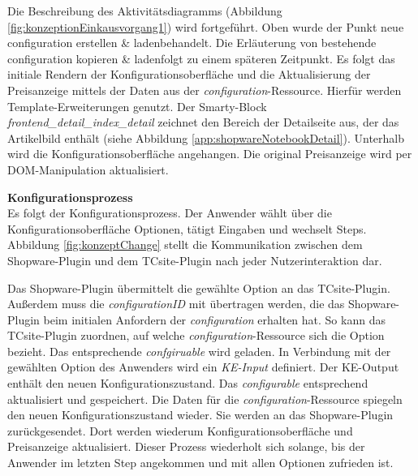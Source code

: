 \documentclass[12pt,a4paper,bibliography=totocnumbered,listof=totoc]{scrartcl}
\begin{document}
Die Beschreibung des Aktivitätsdiagramms (Abbildung \ref{fig:konzeptionEinkausvorgang1}) wird fortgeführt. Oben wurde der Punkt \glqq neue configuration erstellen \& laden\grqq behandelt. Die Erläuterung von \glqq bestehende configuration kopieren \& laden\grqq folgt zu einem späteren Zeitpunkt. Es folgt das initiale Rendern der Konfigurationsoberfläche und die Aktualisierung der Preisanzeige mittels der Daten aus der \emph{configuration}-Ressource. Hierfür werden Template-Erweiterungen genutzt. Der Smarty-Block \emph{frontend\_detail\_index\_detail} zeichnet den Bereich der Detailseite aus, der das Artikelbild enthält (siehe Abbildung \ref{app:shopwareNotebookDetail}). Unterhalb wird die Konfigurationsoberfläche angehangen. Die original Preisanzeige wird per DOM-Manipulation aktualisiert.

\textbf{Konfigurationsprozess}\\
Es folgt der Konfigurationsprozess. Der Anwender wählt über die Konfigurationsoberfläche Optionen, tätigt Eingaben und wechselt Steps. Abbildung \ref{fig:konzeptChange} stellt die Kommunikation zwischen dem Shopware-Plugin und dem TCsite-Plugin nach jeder Nutzerinteraktion dar.

Das Shopware-Plugin übermittelt die gewählte Option an das TCsite-Plugin. Außerdem muss die \emph{configurationID} mit übertragen werden, die das Shopware-Plugin beim initialen Anfordern der \emph{configuration} erhalten hat. So kann das TCsite-Plugin zuordnen, auf welche \emph{configuration}-Ressource sich die Option bezieht. Das entsprechende \emph{confgiruable} wird geladen. In Verbindung mit der gewählten Option des Anwenders wird ein \emph{KE-Input} definiert. Der KE-Output enthält den neuen Konfigurationszustand. Das \emph{configurable} entsprechend aktualisiert und gespeichert. Die Daten für die \emph{configuration}-Ressource spiegeln den neuen Konfigurationszustand wieder. Sie werden an das Shopware-Plugin zurückgesendet. Dort werden wiederum Konfigurationsoberfläche und Preisanzeige aktualisiert. Dieser Prozess wiederholt sich solange, bis der Anwender im letzten Step angekommen und mit allen Optionen zufrieden ist.
\end{document}
